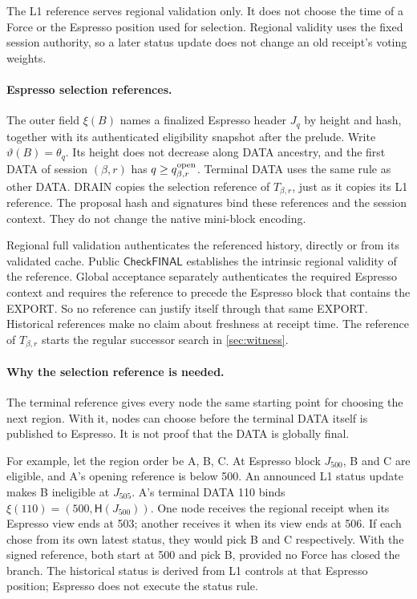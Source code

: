 \documentclass[11pt,a4paper]{article}
\newcommand{\Hash}{\mathsf H}
\newcommand{\tagg}[1]{\ensuremath{\mathsf{#1}}}
\begin{document}
The L1 reference serves regional validation only. It does not choose
the time of a Force or the Espresso position used for selection.
Regional validity uses the fixed session authority, so a later status
update does not change an old receipt's voting weights.

\paragraph{Espresso selection references.}
The outer field $\xi(B)$ names a finalized Espresso header $J_q$ by
height and hash, together with its authenticated eligibility snapshot
after the prelude. Write $\vartheta(B)=\theta_q$. Its height does not
decrease along DATA ancestry, and the first DATA of session $(\beta,r)$
has $q\ge q_{\beta,r}^{\rm open}$. Terminal DATA uses the same rule as
other DATA. DRAIN copies the selection reference of $T_{\beta,r}$, just
as it copies its L1 reference. The proposal hash and signatures bind
these references and the session context. They do not change the native
mini-block encoding.

Regional full validation authenticates the referenced history, directly
or from its validated cache. Public \tagg{CheckFINAL} establishes the
intrinsic regional validity of the reference. Global acceptance
separately authenticates the required Espresso context and requires the
reference to precede the Espresso block that contains the EXPORT. So no
reference can justify itself through that same EXPORT. Historical
references make no claim about freshness at receipt time. The reference
of $T_{\beta,r}$ starts the regular successor search in \cref{sec:witness}.

\paragraph{Why the selection reference is needed.}
The terminal reference gives every node the same starting point for
choosing the next region. With it, nodes can choose before the terminal
DATA itself is published to Espresso. It is not proof that the DATA is
globally final.

For example, let the region order be A, B, C. At Espresso block $J_{500}$,
B and C are eligible, and A's opening reference is below 500. An announced
L1 status update makes B ineligible at $J_{505}$. A's terminal DATA 110
binds $\xi(110)=(500,\Hash(J_{500}))$. One node receives the regional
receipt when its Espresso view ends at 503; another receives it when its
view ends at 506. If each chose from its own latest status, they would
pick B and C respectively. With the signed reference, both start at 500
and pick B, provided no Force has closed the branch. The historical
status is derived from L1 controls at that Espresso position; Espresso
does not execute the status rule.
\end{document}
